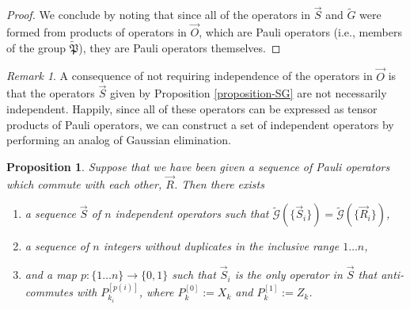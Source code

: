 \documentclass[12pt]{amsbook}
\theoremstyle{plain}
\newtheorem{proposition}{Proposition}
\theoremstyle{definition}
\theoremstyle{remark}
\newtheorem{remark}{Remark}
\newcommand{\lst}{\vec}
\newcommand{\set}{\tilde}
\newcommand{\genfun}{\tilde{\mathcal{G}}}
\newcommand{\pauligroup}{{\set{\mathfrak{P}}}}
\newcommand{\paren}[1]{\left(#1\right)}
\begin{document}
\begin{proof}
We conclude by noting that since all of the operators in $\lst S$ and $\set G$ were formed from products of operators in $\lst O$, which are Pauli operators (i.e., members of the group $\pauligroup$), they are Pauli operators themselves.
\end{proof}
\begin{remark}
A consequence of not requiring independence of the operators in $\lst O$ is that the operators $\lst S$ given by Proposition \ref{proposition-SG} are not necessarily independent.  Happily, since all of these operators can be expressed as tensor products of Pauli operators, we can construct a set of independent operators by performing an analog of Gaussian elimination.
\end{remark}

\begin{proposition}
\label{make-independent-using-elimination}
Suppose that we have been given a sequence of Pauli operators which commute with each other, $\lst R$.  Then there exists
\begin{enumerate}
\item a sequence $\lst S$ of $n$ independent operators such that $\genfun\paren{\{\lst S_i\}}=\genfun\paren{\{\lst R_i\}}$,
\item a sequence of $n$ integers without duplicates in the inclusive range $1\dots n$,
\item and a map $p:\{1\dots n\} \to \{0,1\}$ such that $\lst S_i$ is the only operator in $\lst S$ that anti-commutes with $P_{k_i}^{[p(i)]}$, where $P_k^{[0]}:=X_k$ and $P_k^{[1]}:=Z_k$.
\end{enumerate}
\end{proposition}
\end{document}

